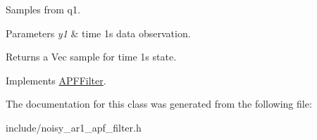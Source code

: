 Samples from q1. 


\begin{DoxyParams}{Parameters}
{\em y1} & time 1\textquotesingle{}s data observation. \\
\hline
\end{DoxyParams}
\begin{DoxyReturn}{Returns}
a Vec sample for time 1\textquotesingle{}s state. 
\end{DoxyReturn}


Implements \hyperlink{classAPFFilter_a017be49a493263156ae60ccc424f7daa}{A\+P\+F\+Filter}.



The documentation for this class was generated from the following file\+:\begin{DoxyCompactItemize}
\item 
include/noisy\+\_\+ar1\+\_\+apf\+\_\+filter.\+h\end{DoxyCompactItemize}
